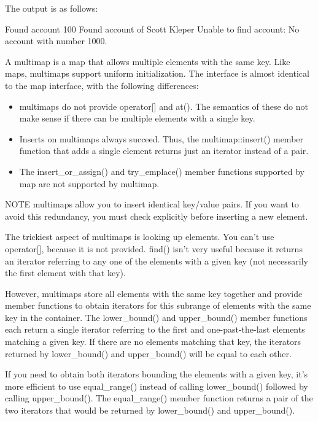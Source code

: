 The output is as follows:

\begin{shell}
Found account 100
Found account of Scott Kleper
Unable to find account: No account with number 1000.
\end{shell}


A multimap is a map that allows multiple elements with the same key. Like maps, multimaps support uniform initialization. The interface is almost identical to the map interface, with the following differences:

\begin{itemize}
\item
multimaps do not provide operator[] and at(). The semantics of these do not make sense if there can be multiple elements with a single key.

\item
Inserts on multimaps always succeed. Thus, the multimap::insert() member function that adds a single element returns just an iterator instead of a pair.

\item
The insert\_or\_assign() and try\_emplace() member functions supported by map are not supported by multimap.
\end{itemize}

\begin{myNotic}{NOTE}
multimaps allow you to insert identical key/value pairs. If you want to avoid this redundancy, you must check explicitly before inserting a new element.
\end{myNotic}

The trickiest aspect of multimaps is looking up elements. You can’t use operator[], because it is not provided. find() isn’t very useful because it returns an iterator referring to any one of the elements with a given key (not necessarily the first element with that key).

However, multimaps store all elements with the same key together and provide member functions to obtain iterators for this subrange of elements with the same key in the container. The lower\_bound() and upper\_bound() member functions each return a single iterator referring to the first and one-past-the-last elements matching a given key. If there are no elements matching that key, the iterators returned by lower\_bound() and upper\_bound() will be equal to each other.

If you need to obtain both iterators bounding the elements with a given key, it’s more efficient to use equal\_range() instead of calling lower\_bound() followed by calling upper\_bound(). The equal\_range() member function returns a pair of the two iterators that would be returned by lower\_bound() and upper\_bound().

